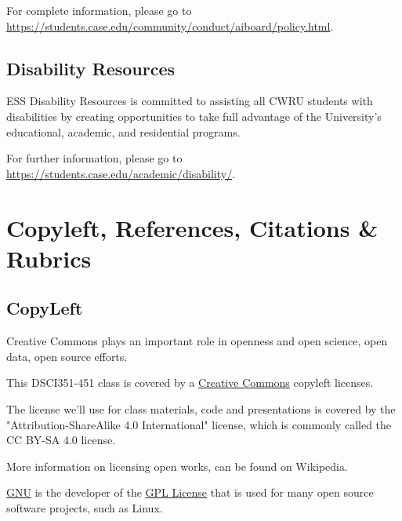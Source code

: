 \documentclass[10pt]{article} %
\begin{document}
    For complete information, please go to \href{"https://students.case.edu/community/conduct/aiboard/policy.html"}{https://students.case.edu/community/conduct/aiboard/policy.html}.

  \subsection{Disability Resources}

    ESS Disability Resources is committed to assisting all CWRU students with disabilities by creating opportunities to take full advantage of the University's educational, academic, and residential programs.

    For further information, please go to \href{"https://students.case.edu/academic/disability/''}{https://students.case.edu/academic/disability/}.


\section{Copyleft, References, Citations  \& Rubrics}

  \subsection{CopyLeft}

    Creative Commons plays an important role in openness and open science, open data, open source efforts.

    This DSCI351-451 class \cite{french_dsci351-451:_2016} is covered by a \href{"http://creativecommons.org/licenses/"}{Creative Commons}  \cite{commons_creative_2014} copyleft licenses.

    The license we'll use for class materials, code and presentations is covered by  the "Attribution-ShareAlike 4.0 International" license, which is commonly called the CC BY-SA 4.0 license. \cite{_creative_2015}

    More information on licensing open works, can be found on Wikipedia. \cite{commons_creative_2014-1}

    \href{"http://www.gnu.org/copyleft/gpl.html"}{GNU} \cite{gnu_gnu.org_2014} is the developer of the \href{"http://en.wikipedia.org/wiki/GNU_General_Public_License"}{GPL License} \cite{gpl_gnu_2014}  that is used for many open source software projects, such as Linux.
\end{document}
